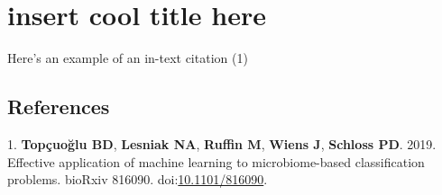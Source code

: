 \documentclass[11pt,]{article}
\author{}
\date{\vspace{-2.5em}}
\begin{document}
\hypertarget{insert-cool-title-here}{%
\section{insert cool title here}\label{insert-cool-title-here}}

Here's an example of an in-text citation (1)

\hypertarget{references}{%
\subsection*{References}\label{references}}

\hypertarget{refs}{}
\leavevmode\hypertarget{ref-topcuoglu_effective_2019}{}%
1. \textbf{Topçuoğlu BD}, \textbf{Lesniak NA}, \textbf{Ruffin M},
\textbf{Wiens J}, \textbf{Schloss PD}. 2019. Effective application of
machine learning to microbiome-based classification problems. bioRxiv
816090. doi:\href{https://doi.org/10.1101/816090}{10.1101/816090}.
\end{document}
